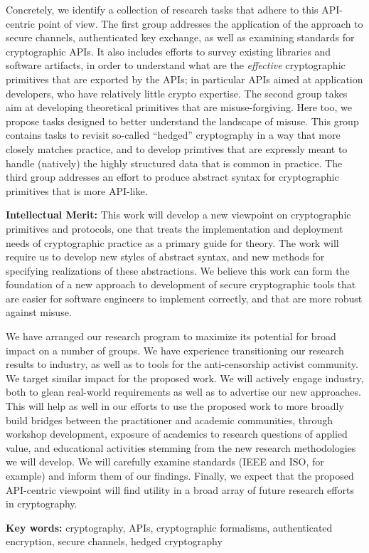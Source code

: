 \documentclass[10pt]{article}
\begin{document}
Concretely, we identify a collection of research tasks that adhere to
this API-centric point of view.  The first group addresses the
application of the approach to secure channels, authenticated key
exchange, as well as examining standards for cryptographic APIs.  It
also includes efforts to survey existing libraries and software
artifacts, in order to understand what are the \emph{effective}
cryptographic primitives that are exported by the APIs; in particular
APIs aimed at application developers, who have relatively little
crypto expertise.  
%
The second group takes aim at developing
theoretical primitives that are misuse-forgiving.  Here too, we
propose tasks designed to better understand the landscape of misuse.
This group contains tasks to revisit so-called ``hedged'' cryptography
in a way that more closely matches practice, and to develop primtives
that are expressly meant to handle (natively) the highly structured
data that is common in practice.
%
The third group addresses an effort to produce abstract syntax for
cryptographic primitives that is more API-like.
  

\smallskip
\noindent \textbf{Intellectual Merit:} This work will develop a new
viewpoint on cryptographic primitives and protocols, one that treats the
implementation and deployment needs of cryptographic practice as a
primary guide for theory.  The work will require us to develop new styles of
abstract syntax, and new methods for specifying realizations of these
abstractions.  
We believe this work can form the foundation of a new approach to
development of secure cryptographic tools that are easier for
software engineers to implement correctly, and that are more robust against
misuse.  

\smallskip

  We have arranged our research program to
maximize its potential for broad impact on a number of groups. We have
experience transitioning our research results to industry, as well as to tools for the anti-censorship
activist community. We target similar impact for the proposed
work. We will actively engage industry, both to glean real-world requirements
as well as to advertise our new approaches.  This will help as well in our efforts
to use the proposed work to more broadly build bridges between the practitioner
and academic communities, through workshop development, exposure of academics to 
research questions of applied value, and educational activities stemming from
the new research methodologies we will develop. We will carefully examine
standards (IEEE and ISO, for example) and inform them of our
findings. Finally, we expect that the proposed API-centric viewpoint will find utility in a broad array
of future research efforts in cryptography.

\vspace{1ex}
\noindent 
{\bf Key words:} cryptography, APIs, cryptographic formalisms,
authenticated encryption, secure channels, hedged cryptography
\end{document}

